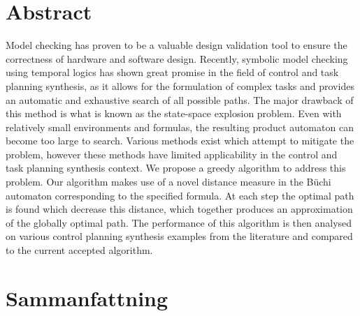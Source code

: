 \section*{\centering Abstract}
Model checking has proven to be a valuable design validation tool to ensure the correctness of hardware and software design. Recently, symbolic model checking using temporal logics has shown great promise in the field of control and task planning synthesis, as it allows for the formulation of complex tasks and provides an automatic and exhaustive search of all possible paths. The major drawback of this method is what is known as the state-space explosion problem. Even with relatively small environments and formulas, the resulting product automaton can become too large to search. Various methods exist which attempt to mitigate the problem, however these methods have limited applicability in the control and task planning synthesis context. We propose a greedy algorithm to address this problem. Our algorithm makes use of a novel distance measure in the B\"uchi automaton corresponding to the specified formula. At each step the optimal path is found which decrease this distance, which together produces an approximation of the globally optimal path. The performance of this algorithm is then analysed on various control planning synthesis examples from the literature and compared to the current accepted algorithm.     





\newpage

\section*{\centering Sammanfattning}

